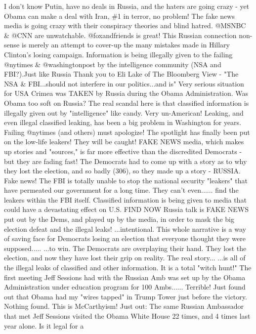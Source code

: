 I don't know Putin, have no deals in Russia, and the haters are going
crazy - yet Obama can make a deal with Iran, \#1 in terror, no problem!
The fake news media is going crazy with their conspiracy theories and
blind hatred. @MSNBC \& @CNN are unwatchable. @foxandfriends is great!
This Russian connection non-sense is merely an attempt to cover-up the
many mistakes made in Hillary Clinton's losing campaign. Information is
being illegally given to the failing @nytimes \& @washingtonpost by the
intelligence community (NSA and FBI?).Just like Russia Thank you to Eli
Lake of The Bloomberg View - "The NSA \& FBI...should not interfere in
our politics...and is" Very serious situation for USA Crimea was TAKEN
by Russia during the Obama Administration. Was Obama too soft on Russia?
The real scandal here is that classified information is illegally given
out by "intelligence" like candy. Very un-American! Leaking, and even
illegal classified leaking, has been a big problem in Washington for
years. Failing @nytimes (and others) must apologize! The spotlight has
finally been put on the low-life leakers! They will be caught! FAKE NEWS
media, which makes up stories and "sources," is far more effective than
the discredited Democrats - but they are fading fast! The Democrats had
to come up with a story as to why they lost the election, and so badly
(306), so they made up a story - RUSSIA. Fake news! The FBI is totally
unable to stop the national security "leakers" that have permeated our
government for a long time. They can't even...... find the leakers
within the FBI itself. Classified information is being given to media
that could have a devastating effect on U.S. FIND NOW Russia talk is
FAKE NEWS put out by the Dems, and played up by the media, in order to
mask the big election defeat and the illegal leaks! ...intentional. This
whole narrative is a way of saving face for Democrats losing an election
that everyone thought they were supposed..... ...to win. The Democrats
are overplaying their hand. They lost the election, and now they have
lost their grip on reality. The real story... ...is all of the illegal
leaks of classified and other information. It is a total "witch hunt!"
The first meeting Jeff Sessions had with the Russian Amb was set up by
the Obama Administration under education program for 100 Ambs......
Terrible! Just found out that Obama had my "wires tapped" in Trump Tower
just before the victory. Nothing found. This is McCarthyism! Just out:
The same Russian Ambassador that met Jeff Sessions visited the Obama
White House 22 times, and 4 times last year alone. Is it legal for a
